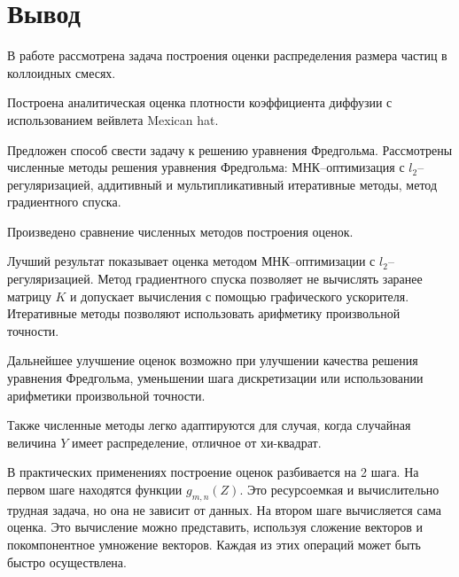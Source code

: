 \documentclass[../paper.tex]{subfiles}
\begin{document}
\section{Вывод}
В работе рассмотрена задача построения оценки распределения размера частиц в коллоидных смесях.

Построена аналитическая оценка плотности коэффициента диффузии с использованием вейвлета Mexican hat.

Предложен способ свести задачу к решению уравнения Фредгольма.
Рассмотрены численные методы решения уравнения Фредгольма: МНК--опти\-ми\-зация с $l_2$--регуляризацией,
аддитивный и мультипликативный итеративные методы, метод градиентного спуска.

Произведено сравнение численных методов построения оценок.

Лучший результат показывает оценка методом МНК--оптимизации с $l_2$--регу\-ляризацией.
Метод градиентного спуска позволяет не вычислять заранее матрицу $K$ и допускает вычисления с помощью графического ускорителя.
Итеративные методы позволяют использовать арифметику произвольной точности.

Дальнейшее улучшение оценок возможно при улучшении качества решения уравнения Фредгольма, уменьшении шага дискретизации или
использовании арифметики произвольной точности.

Также численные методы легко адаптируются для случая, когда случайная величина $Y$ имеет распределение, отличное от хи-квадрат.

В практических применениях построение оценок разбивается на 2 шага. На первом шаге находятся функции $g_{m,n}(Z)$. Это ресурсоемкая и вычислительно трудная задача,
но она не зависит от данных. На втором шаге вычисляется сама оценка. Это вычисление можно представить, используя сложение векторов и покомпонентное умножение векторов.
Каждая из этих операций может быть быстро осуществлена.
\end{document}
